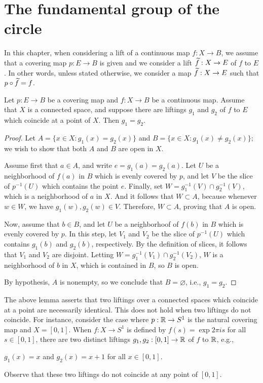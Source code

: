 \section{The fundamental group of the circle}

\begin{rmk}
    In this chapter, when considering a lift of a continuous map $f: X\rightarrow B$, we assume that a covering map $p: E\rightarrow B$ is given and we consider a lift $\widetilde{f}: X\rightarrow E$ of $f$ to $E$.
    In other words, unless stated otherwise, we consider a map $\widetilde{f}: X\rightarrow E$ such that $p\circ\widetilde{f}=f$.
\end{rmk}

\begin{lem}
    Let $p: E\rightarrow B$ be a covering map and $f: X\rightarrow B$ be a continuous map.
    Assume that $X$ is a connected space, and suppose there are liftings $g_1$ and $g_2$ of $f$ to $E$ which coincide at a point of $X$.
    Then $g_1=g_2$.
\end{lem}
\begin{proof}
    Let $A=\{x\in X: g_1(x)=g_2(x)\}$ and $B=\{x\in X: g_1(x)\neq g_2(x)\}$; we wish to show that both $A$ and $B$ are open in $X$.

    Assume first that $a\in A$, and write $e=g_1(a)=g_2(a)$.
    Let $U$ be a neighborhood of $f(a)$ in $B$ which is evenly covered by $p$, and let $V$ be the slice of $p^{-1}(U)$ which contains the point $e$.
    Finally, set $W=g_1^{-1}(V)\cap g_2^{-1}(V)$, which is a neighborhood of $a$ in $X$.
    And it follows that $W\subset A$, because whenever $w\in W$, we have $g_1(w), g_2(w)\in V$.
    Therefore, $W\subset A$, proving that $A$ is open.

    Now, assume that $b\in B$, and let $U$ be a neighborhoof of $f(b)$ in $B$ which is evenly covered by $p$.
    In this step, let $V_1$ and $V_2$ be the slice of $p^{-1}(U)$ which contains $g_1(b)$ and $g_2(b)$, respectively.
    By the definition of slices, it follows that $V_1$ and $V_2$ are disjoint.
    Letting $W=g_1^{-1}(V_1)\cap g_2^{-1}(V_2)$, $W$ is a neighborhood of $b$ in $X$, which is contained in $B$, so $B$ is open.

    By hypothesis, $A$ is nonempty, so we conclude that $B=\varnothing$, i.e., $g_1=g_2$.
\end{proof}
\begin{exmp}
    The above lemma asserts that two liftings over a connected spaces which coincide at a point are necessarily identical.
    This does not hold when two liftings do not coincide.
    For instance, consider the case where $p: {\mathbb{R}}\rightarrow S^1$ is the natural covering map and $X=[0, 1]$.
    When $f: X\rightarrow S^1$ is defined by $f(s)=\exp{2\pi i s}$ for all $s\in [0, 1]$, there are two distinct liftings $g_1, g_2: [0, 1]\rightarrow{\mathbb{R}}$ of $f$ to ${\mathbb{R}}$, e.g.,
    \begin{center}
        $g_1(x)=x$ and $g_2(x)=x+1$ for all $x\in[0, 1]$.
    \end{center}
    Observe that these two liftings do not coincide at any point of $[0, 1]$.
\end{exmp}


